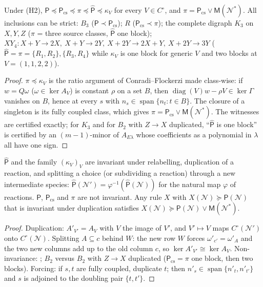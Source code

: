 \documentclass[11pt,a4paper]{report}
\newcommand{\Net}{\mathcal{N}}
\newcommand{\Nd}{\mathcal{N}^{*}}
\newcommand{\spn}{\operatorname{span}}
\newcommand{\Pre}{\mathsf{P}}
\newcommand{\Pcs}{\mathsf{P}_{\mathrm{cs}}}
\newcommand{\Ph}{\widehat{\mathsf{P}}}
\newcommand{\Mips}{\mathsf{M}}
\newcommand{\refi}{\preceq}
\begin{document}
\begin{proposition}\label{prop:hierarchy}
Under (H2), \(\Pre\refi\Pcs\refi\pi\refi\Ph\refi\kappa_V\) for every \(V\in C^\circ\), and \(\pi=\Pcs\vee\Mips(\Nd)\).
All inclusions can be strict: \(B_3\) (\(\Pre\prec\Pcs\)); \(R\) (\(\Pcs\prec\pi\)); the complete digraph \(K_3\) on
\(X,Y,Z\) (\(\pi\) = three source classes, \(\Ph\) one block); \(XY_4\colon X+Y\to2X,\ X+Y\to2Y,\ X+2Y\to2X+Y,\
X+2Y\to3Y\) (\(\Ph=\pi=\{R_1,R_2\},\{R_3,R_4\}\) while \(\kappa_V\) is one block for generic \(V\) and two blocks at
\(V=(1,1,2,2)\)).
\end{proposition}
\begin{proof}
\(\pi\refi\kappa_V\) is the ratio argument of Conradi--Flockerzi made class-wise: if \(w=Q\omega\) (\(\omega\in\ker
A_V\)) is constant \(\rho\) on a set \(B\), then \(\operatorname{diag}(V)w-\rho V\in\ker\Gamma\) vanishes on \(B\),
hence at every \(s\) with \(n_s\in\spn\{n_t:t\in B\}\). The closure of a singleton is its fully coupled class, which
gives \(\pi=\Pcs\vee\Mips(\Nd)\). The witnesses are certified exactly; for \(K_3\) and for \(B_2\) with \(Z\to X\)
duplicated, ``\(\Ph\) is one block'' is certified by an \((m-1)\)-minor of \(A_{E\lambda}\) whose coefficients as a
polynomial in \(\lambda\) all have one sign.
\end{proof}

\begin{theorem}\label{thm:invariance}
\(\Ph\) and the family \((\kappa_V)_V\) are invariant under relabelling, duplication of a reaction, and splitting a
choice (or subdividing a reaction) through a new intermediate species: \(\Ph(\Net')=\varphi^{-1}(\Ph(\Net))\) for the
natural map \(\varphi\) of reactions. \(\Pre\), \(\Pcs\) and \(\pi\) are not invariant. Any rule \(X\) with
\(X(\Net)\succeq\Pre(\Net)\) that is invariant under duplication satisfies \(X(\Net)\succeq\Pre(\Net)\vee\Mips(\Nd)\).
\end{theorem}
\begin{proof}
Duplication: \(A'_{V'}=A_V\) with \(V\) the image of \(V'\), and \(V'\mapsto V\) maps \(C^\circ(\Net')\) onto
\(C^\circ(\Net)\). Splitting \(A\subseteq c\) behind \(W\): the new row \(W\) forces \(\omega'_{c'}=\omega'_A\) and the
two new columns add up to the old column \(c\), so \(\ker A'_{V'}\cong\ker A_V\). Non-invariance:
\zcref{prop:split}; \(B_2\) versus \(B_2\) with \(Z\to X\) duplicated (\(\Pcs=\pi\) one block, then two blocks).
Forcing: if \(s,t\) are fully coupled, duplicate \(t\); then \(n'_s\in\spn\{n'_t,n'_{t'}\}\) and \(s\) is adjoined to
the doubling pair \(\{t,t'\}\).
\end{proof}
\end{document}
